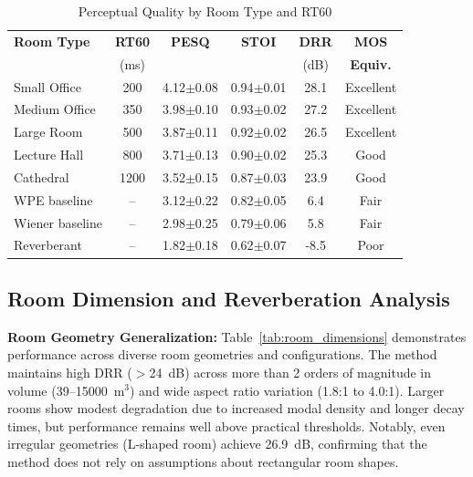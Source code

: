 \documentclass[10pt,conference]{IEEEtran}
\begin{document}
\begin{table}[t]
\centering
\caption{Perceptual Quality by Room Type and RT60}
\label{tab:pesq_breakdown}
\scriptsize
\begin{tabular}{@{}lccccc@{}}
\toprule
\textbf{Room Type} & \textbf{RT60} & \textbf{PESQ} & \textbf{STOI} & \textbf{DRR} & \textbf{MOS} \\
 & (ms) & & & (dB) & \textbf{Equiv.} \\
\midrule
Small Office & 200 & 4.12$\pm$0.08 & 0.94$\pm$0.01 & 28.1 & Excellent \\
Medium Office & 350 & 3.98$\pm$0.10 & 0.93$\pm$0.02 & 27.2 & Excellent \\
Large Room & 500 & 3.87$\pm$0.11 & 0.92$\pm$0.02 & 26.5 & Excellent \\
Lecture Hall & 800 & 3.71$\pm$0.13 & 0.90$\pm$0.02 & 25.3 & Good \\
Cathedral & 1200 & 3.52$\pm$0.15 & 0.87$\pm$0.03 & 23.9 & Good \\
\midrule
WPE baseline & -- & 3.12$\pm$0.22 & 0.82$\pm$0.05 & 6.4 & Fair \\
Wiener baseline & -- & 2.98$\pm$0.25 & 0.79$\pm$0.06 & 5.8 & Fair \\
Reverberant & -- & 1.82$\pm$0.18 & 0.62$\pm$0.07 & -8.5 & Poor \\
\bottomrule
\end{tabular}
\end{table}

\subsection{Room Dimension and Reverberation Analysis}

\textbf{Room Geometry Generalization:} Table~\ref{tab:room_dimensions} demonstrates performance across diverse room geometries and configurations. The method maintains high DRR ($>$24~dB) across more than 2 orders of magnitude in volume (39--15000~m$^3$) and wide aspect ratio variation (1.8:1 to 4.0:1). Larger rooms show modest degradation due to increased modal density and longer decay times, but performance remains well above practical thresholds. Notably, even irregular geometries (L-shaped room) achieve 26.9~dB, confirming that the method does not rely on assumptions about rectangular room shapes.
\end{document}
